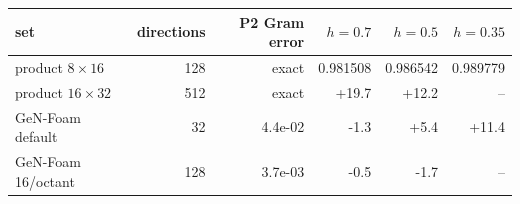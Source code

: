 \begin{tabular}{lrrrrr}
\hline
set & directions & P2 Gram error & $h = 0.7$ & $h = 0.5$ & $h = 0.35$\\
\hline
product $8\times16$ & 128 & exact & 0.981508 & 0.986542 & 0.989779\\
product $16\times32$ & 512 & exact & +19.7 & +12.2 & --\\
GeN-Foam default & 32 & 4.4e-02 & -1.3 & +5.4 & +11.4\\
GeN-Foam 16/octant & 128 & 3.7e-03 & -0.5 & -1.7 & --\\
\hline
\end{tabular}
